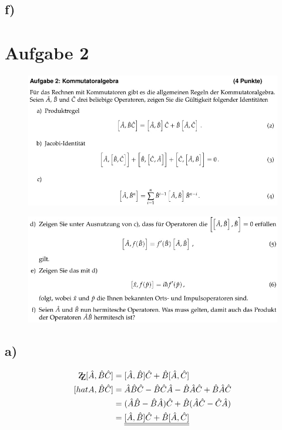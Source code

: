     \subsection{f)}


\section{Aufgabe 2}

    \begin{figure}[H]
        \centering
        \includegraphics[width=\textwidth]{images/Aufgabe2abc.jpg}
        \label{fig:2}
    \end{figure}

    \begin{figure}[H]
        \centering
        \includegraphics[width=\textwidth]{images/Aufgabe2def.jpg}
        \label{fig:3}
    \end{figure}

    \subsection{a)}
    \begin{align*}
    \mathrm{Z\kern-.3em\raise-0.5ex\hbox{Z}} [\hat A, \hat B \hat C] &= [\hat A , \hat B]\hat C + \hat B [\hat A , \hat C]\\
    [hat A , \hat B \hat C] &= \hat A \hat B \hat C - \hat B \hat C \hat A -\hat B \hat A \hat C + \hat B \hat A \hat C\\
    &=(\hat A \hat B - \hat B \hat A) \hat C + \hat B (\hat A \hat C -\hat C \hat A)\\
    &=\underline{\underline{[\hat A , \hat B]\hat C + \hat B [\hat A , \hat C]}}
    \end{align*}
